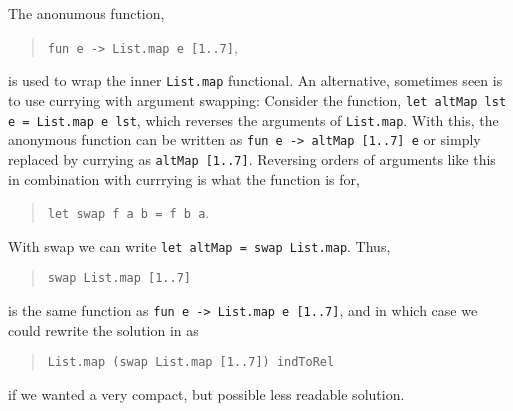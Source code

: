 \documentclass[fsharpnotes.tex]{subfiles}
\begin{document}
\begin{comment}
As an example, consider the list of string-concatenations of every combination of \lstinline{["a","b"]} and \lstinline{["1"; "2"; "3"]}, i.e., \lstinline{["a1"; "a2"; "a3"; "b1"; "b2"; "b3"]}. For the first element in the letter-list, this can be hard-coded as
\begin{quote}
\lstinline{List.map (fun d -> "a"+d) ["1"; "2"; "3"]},
\end{quote}
which produces \lstinline{["a1"; "a2"; "a3"]}. Using an outer \lstinline{List.map} iterating over all letters looks like:
\begin{quote}
\lstinline{List.map (fun l -> List.map (fun d -> l+d) ["1";"2";"3"]) ["a"; "b"]},
\end{quote}
which produces \lstinline{[a1"; a2"; "a3"; "b1"; "b2"; "b3"]}.

The code for \lstinline{candidateRelativeMoves}, shown in \Cref{pieces}, is similar in spirit to the letter and digit example above, but is further complicated by the fact that \lstinline{indToRel} is a list of functions.
\end{comment}
%
%
The anonumous function,
\begin{quote}
\lstinline{fun e -> List.map e [1..7]},
\end{quote}
is used to wrap the inner \lstinline{List.map} functional. An alternative, sometimes seen is to use currying with argument swapping: Consider the function, \lstinline{let altMap lst e = List.map e lst}, which reverses the arguments of \lstinline{List.map}. With this, the anonymous function can be written as \lstinline{fun e -> altMap [1..7] e} or simply replaced by currying as \lstinline{altMap [1..7]}. Reversing orders of arguments like this in combination with currrying is what the  function is for,
\begin{quote}
\lstinline{let swap f a b = f b a}.
\end{quote}
With swap we can write \lstinline{let altMap = swap List.map}. Thus,
\begin{quote}
\lstinline{swap List.map [1..7]}
\end{quote}
is the same function as \lstinline{fun e -> List.map e [1..7]}, and in which case we could rewrite the solution in  as
\begin{quote}
\lstinline{List.map (swap List.map [1..7]) indToRel}
\end{quote}
if we wanted a very compact, but possible less readable solution.
\end{document}

